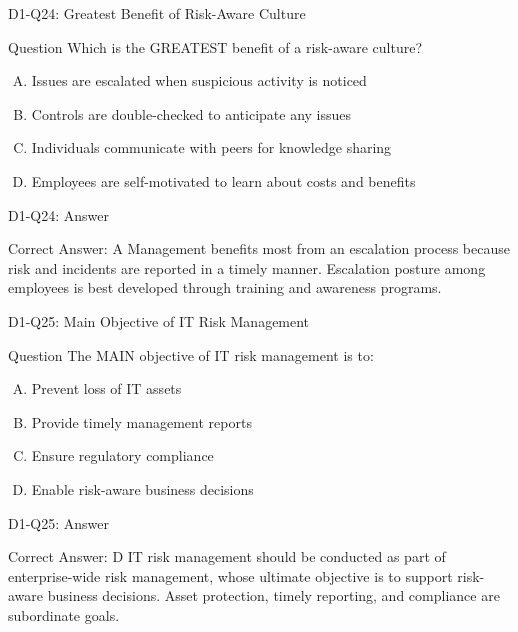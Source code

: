 \documentclass{beamer}
\begin{document}
	\begin{frame}{D1-Q24: Greatest Benefit of Risk-Aware Culture}
		\begin{block}{Question}
			Which is the GREATEST benefit of a risk-aware culture?
		\end{block}
		\begin{enumerate}[(A)]
			\item Issues are escalated when suspicious activity is noticed
			\item Controls are double-checked to anticipate any issues
			\item Individuals communicate with peers for knowledge sharing
			\item Employees are self-motivated to learn about costs and benefits
		\end{enumerate}
	\end{frame}
	\begin{frame}{D1-Q24: Answer}
		\begin{block}{Correct Answer: A}
			Management benefits most from an escalation process because risk and incidents are reported in a timely manner. Escalation posture among employees is best developed through training and awareness programs.
		\end{block}
	\end{frame}
	
	\begin{frame}{D1-Q25: Main Objective of IT Risk Management}
		\begin{block}{Question}
			The MAIN objective of IT risk management is to:
		\end{block}
		\begin{enumerate}[(A)]
			\item Prevent loss of IT assets
			\item Provide timely management reports
			\item Ensure regulatory compliance
			\item Enable risk-aware business decisions
		\end{enumerate}
	\end{frame}
	\begin{frame}{D1-Q25: Answer}
		\begin{block}{Correct Answer: D}
			IT risk management should be conducted as part of enterprise-wide risk management, whose ultimate objective is to support risk-aware business decisions. Asset protection, timely reporting, and compliance are subordinate goals.
		\end{block}
	\end{frame}
	
\end{document}
